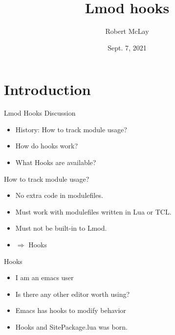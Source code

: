 \documentclass{beamer}
\begin{document}
\title[Lmod]{Lmod hooks}
\author{Robert McLay} 
\date{Sept. 7, 2021}

\frame{\titlepage} 

\section{Introduction}

\begin{frame}{Lmod Hooks Discussion}
  \begin{itemize}
    \item History: How to track module usage?
    \item How do hooks work?
    \item What Hooks are available?
  \end{itemize}
\end{frame}

\begin{frame}{How to track module usage?}
  \begin{itemize}
    \item No extra code in modulefiles.
    \item Must work with modulefiles written in Lua or TCL.
    \item Must not be built-in to Lmod.
    \item $\Rightarrow$ Hooks
  \end{itemize}
\end{frame}

\begin{frame}{Hooks}
  \begin{itemize}
    \item I am an emacs user 
    \item Is there any other editor worth using?
    \item Emacs has hooks to modify behavior
    \item Hooks and SitePackage.lua was born.
  \end{itemize}
\end{frame}
\end{document}
